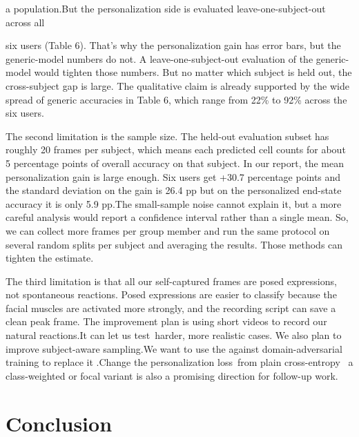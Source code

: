 \documentclass[12pt,a4paper]{article}
\begin{document}
a population.But the personalization side is evaluated leave-one-subject-out across all 

six users (Table 6). That’s why the personalization gain has error bars, but the generic-model numbers do not. A leave-one-subject-out evaluation of the generic-model would tighten those numbers. But no matter which subject is held out, the cross-subject gap is large. The qualitative claim is already supported by the wide spread of generic accuracies in Table 6, which range from 22\% to 92\% across the six users. 

The second limitation is the sample size. The held-out evaluation subset has roughly 20 frames per subject, which means each predicted cell counts for about 5 percentage points of overall accuracy on that subject. In our report, the mean personalization gain is large enough. Six users get +30.7 percentage points and the standard deviation on the gain is 26.4 pp but on the personalized end-state accuracy it is only 5.9 pp.The small-sample noise cannot explain it, but a more careful analysis would report a confidence interval rather than a single mean. So, we can collect more frames per group member and run the same protocol on several random splits per subject and averaging the results. Those methods can tighten the estimate. 

The third limitation is that all our self-captured frames are posed expressions, not spontaneous reactions. Posed expressions are easier to classify because the facial muscles are activated more strongly, and the recording script can save a clean peak frame. The improvement plan is using short videos to record our natural reactions.It can let us test harder, more realistic cases. We also plan to improve subject-aware sampling.We want to use the against domain-adversarial training to replace it \autocite{ganin2015dann}.Change the personalization loss from plain cross-entropy  a class-weighted or focal variant is also a promising direction for follow-up work. 


\section{Conclusion}
\label{sec:conclusion}
\end{document}
